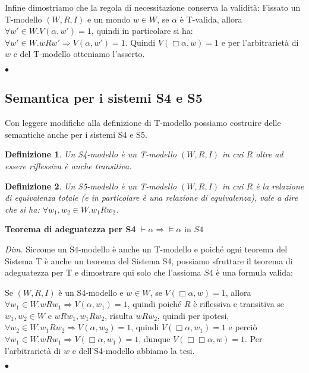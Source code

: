\documentclass[a4paper, 12pt]{article}
\newtheorem{definition}{Definizione}
\begin{document}
\begin{flushleft}
Infine dimostriamo che la regola di necessitazione conserva la validità:
Fissato un T-modello $(W, R, I)$ e un mondo $w \in W$,
se $\alpha$ è T-valida, allora $\forall w' \in W.V(\alpha, w') = 1$,
quindi in particolare si ha: $\forall w' \in W. wRw' \Rightarrow V(\alpha, w') = 1$.
Quindi $V(\Box \alpha, w) = 1$ e per l'arbitrarietà di $w$ e del T-modello otteniamo l'asserto.


\begin{flushright}
$\bullet$
\end{flushright}
\end{flushleft}

\subsection{Semantica per i sistemi S4 e S5}
Con leggere modifiche alla definizione di T-modello possiamo costruire delle semantiche
anche per i sistemi S4 e S5.

\begin{definition}
Un S4-modello è un T-modello $(W, R, I)$ in cui $R$ oltre ad essere riflessiva è anche transitiva.
\end{definition}

\begin{definition}
Un S5-modello è un T-modello $(W, R, I)$ in cui $R$ è la relazione di equivalenza totale
(e in particolare è una relazione di equivalenza),
vale a dire che si ha: $\forall w_1, w_2 \in W. w_1 R w_2$.
\end{definition}

\begin{flushleft}
\textbf{Teorema di adeguatezza per S4}
$\vdash \alpha \Rightarrow \vDash \alpha$ in $S4$

\textit{Dim.}
Siccome un S4-modello è anche un T-modello e poiché ogni teorema del Sistema T
è anche un teorema del Sistema S4, possiamo sfruttare il teorema di adeguatezza per T
e dimostrare qui solo che l'assioma $S4$ è una formula valida:

Se $(W, R, I)$ è un S4-modello e $w \in W$,
se $V(\Box \alpha, w) = 1$, allora $\forall w_1 \in W. wRw_1 \Rightarrow V(\alpha, w_1) = 1$,
quindi poiché $R$ è riflessiva e transitiva
se $w_1, w_2 \in W$ e $wRw_1, w_1Rw_2$, risulta $wRw_2$, quindi per ipotesi,
$\forall w_2 \in W. w_1Rw_2 \Rightarrow V(\alpha, w_2) = 1$, quindi $V(\Box \alpha, w_1) = 1$
e perciò $\forall w_1 \in W. wRw_1 \Rightarrow V(\Box \alpha, w_1) = 1$,
dunque $V(\Box \Box \alpha, w) = 1$.
Per l'arbitrarietà di $w$ e dell'S4-modello abbiamo la tesi.


\begin{flushright}
$\bullet$
\end{flushright}
\end{flushleft}
\end{document}
